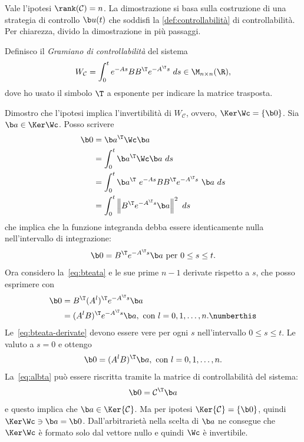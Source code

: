 Vale l'ipotesi $\rank(\mathcal C) = n$.
La dimostrazione si basa sulla costruzione di una strategia di controllo $\b u(t)$
che soddisfi la \autoref{def:controllabilità} di controllabilità.
Per chiarezza, divido la dimostrazione in più passaggi.
\begin{steps}
    \item Definisco il \emph{Gramiano di controllabilità} del sistema
        \begin{equation}
            W_{\mathcal C} = \int_0^t e^{-As} BB^{\T} e^{-A^\T s}\ ds \in \M_{n\times n} (\R),
            \label{eq:controllability-gramian}
        \end{equation}
    dove ho usato il simbolo $\T$ a esponente per indicare la matrice trasposta.

    \item Dimostro che l'ipotesi implica l'invertibilità di $W_{\mathcal C}$, ovvero,
    $\Ker \Wc = \{\b 0\}$.
    Sia $\b a \in \Ker \Wc$.
    Posso scrivere
    \begin{align*}
        \b 0 &= \b a^\T \Wc \b a \\
        &= \int_0^t \b a^\T \Wc \b a \ ds \\
        &= \int_0^t \b a^{\T}\ e^{-As} B B^\T e^{-A^\T s} \ \b a \ ds \\
        &= \int_0^t \left\| B^\T e^{-A^\T s} \b a \right\|^2\ ds
    \end{align*}
    che implica che la funzione integranda debba essere identicamente nulla nell'intervallo di
    integrazione:
    \begin{equation}
        \b 0 = B^\T e^{-A^\T s} \b a  \text{ per } 0 \leq s \leq t.
        \label{eq:bteata}
    \end{equation}
    Ora considero la~\eqref{eq:bteata} e le sue prime $n-1$ derivate rispetto
    a $s$, che posso esprimere con
    \begin{align*}
        \b 0 &= B^{\T} (A^l)^{\T} e^{-A^\T s} \b a\\
        &= (A^l B)^{\T}e^{-A^\T s} \b a , \text{ con } l = {0, 1, \ldots, n}. \numberthis \label{eq:bteata-derivate}
    \end{align*}
    Le~\eqref{eq:bteata-derivate} devono essere vere per ogni $s$ nell'intervallo $0 \leq s \leq t$.
    Le valuto a $s = 0$ e ottengo
    \begin{equation}
        \b 0 = (A^l B)^{\T} \b a , \text{ con } l = {0, 1, \ldots, n}.
        \label{eq:albta}
    \end{equation}
    La~\eqref{eq:albta} può essere riscritta tramite la matrice di controllabilità del sistema:
    \begin{equation*}
        \b 0 = \mathcal C^{\T} \b a
    \end{equation*}
    e questo implica che $\b a \in \Ker{\mathcal C}$.
    Ma per ipotesi $\Ker{\mathcal C} = \{\b 0\}$, quindi $\Ker \Wc \ni \b a = \b 0$.
    Dall'arbitrarietà nella scelta di $\b a$ ne consegue che $\Ker \Wc$ è formato solo
    dal vettore nullo e quindi $\Wc$ è invertibile.


\end{steps}
